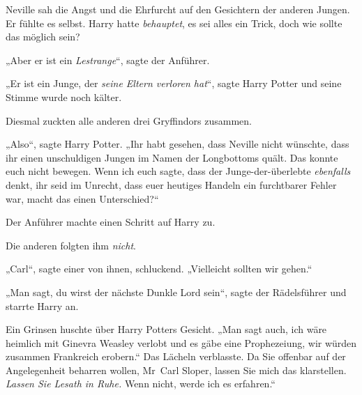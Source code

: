 Neville sah die Angst und die Ehrfurcht auf den Gesichtern der anderen Jungen. Er fühlte es selbst. Harry hatte \emph{behauptet}, es sei alles ein Trick, doch wie sollte das möglich sein?

„Aber er ist ein \emph{Lestrange}“, sagte der Anführer.

„Er ist ein Junge, der \emph{seine Eltern verloren hat}“, sagte Harry Potter und seine Stimme wurde noch kälter.

Diesmal zuckten alle anderen drei Gryffindors zusammen.

„Also“, sagte Harry Potter. „Ihr habt gesehen, dass Neville nicht wünschte, dass ihr einen unschuldigen Jungen im Namen der Longbottoms quält. Das konnte euch nicht bewegen. Wenn ich euch sagte, dass der Junge-der-überlebte \emph{ebenfalls} denkt, ihr seid im Unrecht, dass euer heutiges Handeln ein furchtbarer Fehler war, macht das einen Unterschied?“

Der Anführer machte einen Schritt auf Harry zu.

Die anderen folgten ihm \emph{nicht}.

„Carl“, sagte einer von ihnen, schluckend. „Vielleicht sollten wir gehen.“

„Man sagt, du wirst der nächste Dunkle Lord sein“, sagte der Rädelsführer und starrte Harry an.

Ein Grinsen huschte über Harry Potters Gesicht. „Man sagt auch, ich wäre heimlich mit Ginevra Weasley verlobt und es gäbe eine Prophezeiung, wir würden zusammen Frankreich erobern.“ Das Lächeln verblasste. Da Sie offenbar auf der Angelegenheit beharren wollen, Mr~Carl Sloper, lassen Sie mich das klarstellen. \emph{Lassen Sie Lesath in Ruhe.} Wenn nicht, werde ich es erfahren.“

